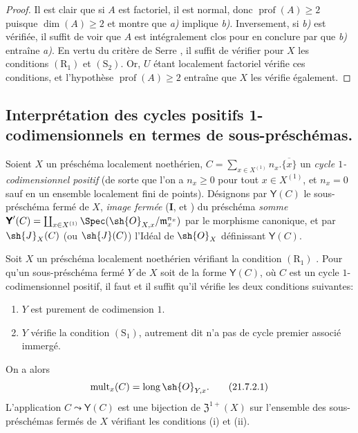 \begin{proof}
Il est clair que si $A$ est factoriel, il est normal, donc $\operatorname{prof}(A)\geq2$ puisque $\dim(A)\geq2$  et  montre que \emph{a)} implique \emph{b)}.
Inversement, si \emph{b)} est vérifiée, il suffit de voir que $A$ est intégralement clos pour en conclure par  que \emph{b)} entraîne \emph{a)}.
En vertu du critère de Serre , il suffit de vérifier pour $X$ les conditions $(\mathrm{R}_1)$ et $(\mathrm{S}_2)$.
Or, $U$ étant localement factoriel vérifie ces conditions, et l'hypothèse $\operatorname{prof}(A)\geq2$ entraîne que $X$ les vérifie également.
\end{proof}
\subsection{Interprétation des cycles positifs 1-codimensionnels en termes de sous-préschémas.}
\label{IV.21.7}

\begin{env}[21.7.1]
\label{IV.21.7.1}
Soient $X$ un préschéma localement noethérien, $C=\sum_{x\in X^{(1)}}n_x.\overline{\{x\}}$ un \emph{cycle $1$-codimensionnel positif} (de sorte que l'on a $n_x\geq0$ pour tout $x\in X^{(1)}$, et $n_x=0$ sauf en un ensemble localement fini de points).
Désignons par $\boldsymbol{\mathsf{Y}}(C)$ le sous-préschéma fermé de $X$, \emph{image fermée} (\textbf{I},  et ) du préschéma \emph{somme} $\boldsymbol{\mathsf{Y}}'(C)=\coprod_{x\in X^{(1)}}\Spec(\sh{O}_{X,x}/\mathfrak{m}_x^{n_x})$ par le morphisme canonique, et par $\sh{J}_X(C)$ (ou $\sh{J}(C)$) l'Idéal de $\sh{O}_X$ définissant $\boldsymbol{\mathsf{Y}}(C)$.
\end{env}

\begin{proposition}[21.7.2]
\label{IV.21.7.2}
Soit $X$ un préschéma localement noethérien vérifiant la condition $(\mathrm{R}_1)$ .
Pour qu'un sous-préschéma fermé $Y$ de $X$ soit de la forme $\boldsymbol{\mathsf{Y}}(C)$, où $C$ est un cycle $1$-codimensionnel positif, il faut et il suffit qu'il vérifie les deux conditions suivantes:
\begin{enumerate}[label=\textup{(\roman*)}]
  \item $Y$ est purement de codimension $1$.
  \item $Y$ vérifie la condition $(\mathrm{S}_1)$, autrement dit  n'a pas de cycle premier associé immergé.
\end{enumerate}

On a alors
\[
\label{IV.21.7.2.1}
  \operatorname{mult}_x(C)=\operatorname{long}\sh{O}_{Y,x}.
  \tag{21.7.2.1}
\]
L'application $C\leadsto\boldsymbol{\mathsf{Y}}(C)$ est une bijection de $\mathfrak{Z}^{1+}(X)$ sur l'ensemble des sous-préschémas fermés de $X$ vérifiant les conditions \textup{(i)} et \textup{(ii)}.
\end{proposition}

